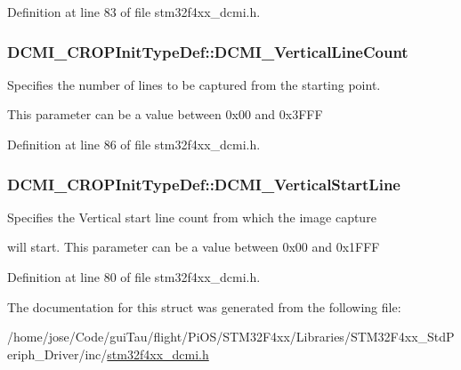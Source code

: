 Definition at line 83 of file stm32f4xx\-\_\-dcmi.\-h.

\hypertarget{struct_d_c_m_i___c_r_o_p_init_type_def_aa12d393dbf969b568b4ec2a643456f20}{
\subsubsection[{D\-C\-M\-I\-\_\-\-Vertical\-Line\-Count}]{ D\-C\-M\-I\-\_\-\-C\-R\-O\-P\-Init\-Type\-Def\-::\-D\-C\-M\-I\-\_\-\-Vertical\-Line\-Count}}\label{struct_d_c_m_i___c_r_o_p_init_type_def_aa12d393dbf969b568b4ec2a643456f20}
\begin{DoxyVerb}      Specifies the number of lines to be captured from the starting point.
\end{DoxyVerb}
 This parameter can be a value between 0x00 and 0x3\-F\-F\-F 

Definition at line 86 of file stm32f4xx\-\_\-dcmi.\-h.

\hypertarget{struct_d_c_m_i___c_r_o_p_init_type_def_a4d4f4ef4975179f025d3cde589e380fe}{
\subsubsection[{D\-C\-M\-I\-\_\-\-Vertical\-Start\-Line}]{ D\-C\-M\-I\-\_\-\-C\-R\-O\-P\-Init\-Type\-Def\-::\-D\-C\-M\-I\-\_\-\-Vertical\-Start\-Line}}\label{struct_d_c_m_i___c_r_o_p_init_type_def_a4d4f4ef4975179f025d3cde589e380fe}
\begin{DoxyVerb}      Specifies the Vertical start line count from which the image capture
\end{DoxyVerb}
 will start. This parameter can be a value between 0x00 and 0x1\-F\-F\-F 

Definition at line 80 of file stm32f4xx\-\_\-dcmi.\-h.



The documentation for this struct was generated from the following file\-:\begin{DoxyCompactItemize}
\item 
/home/jose/\-Code/gui\-Tau/flight/\-Pi\-O\-S/\-S\-T\-M32\-F4xx/\-Libraries/\-S\-T\-M32\-F4xx\-\_\-\-Std\-Periph\-\_\-\-Driver/inc/\hyperlink{stm32f4xx__dcmi_8h}{stm32f4xx\-\_\-dcmi.\-h}\end{DoxyCompactItemize}

